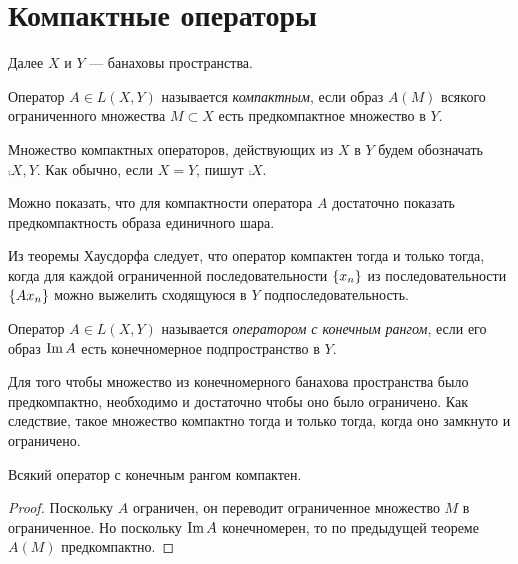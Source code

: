 \section{Компактные операторы}
Далее $X$ и $Y$ --- банаховы пространства.

\begin{definition}
    Оператор $A \in L(X, Y)$ называется \emph{компактным}, если образ $A(M)$ всякого ограниченного
    множества $M \subset X$ есть предкомпактное множество в $Y$.

    Множество компактных операторов, действующих из $X$ в $Y$ будем обозначать
     $\comp{X,Y}$. Как обычно, если $X = Y$, пишут $\comp{X}$.
\end{definition}

Можно показать, что для компактности оператора $A$ достаточно показать предкомпактность образа
единичного шара.

\begin{remark}
Из теоремы Хаусдорфа следует, что оператор компактен тогда и только тогда, когда для каждой
ограниченной последовательности $\left\{x_n\right\}$ из последовательности $\left\{Ax_n\right\}$ можно выжелить
сходящуюся в $Y$ подпоследовательность.
\end{remark}

\begin{definition}
    Оператор $A \in L(X, Y)$ называется \emph{оператором с конечным рангом}, если его образ
    $\operatorname{Im} A$ есть конечномерное подпространство в $Y$.
\end{definition}

\begin{theorem}
    Для того чтобы множество из конечномерного банахова пространства было предкомпактно,
    необходимо и достаточно чтобы оно было ограничено. Как следствие, такое множество компактно
    тогда и только тогда, когда оно замкнуто и ограничено.
\end{theorem}

\begin{theorem}
    Всякий оператор с конечным рангом компактен.
\end{theorem}

\begin{proof}
    Поскольку $A$ ограничен, он переводит ограниченное множество $M$ в ограниченное. Но поскольку
    $\operatorname{Im} A$ конечномерен, то по предыдущей теореме $A(M)$ предкомпактно.
\end{proof}

